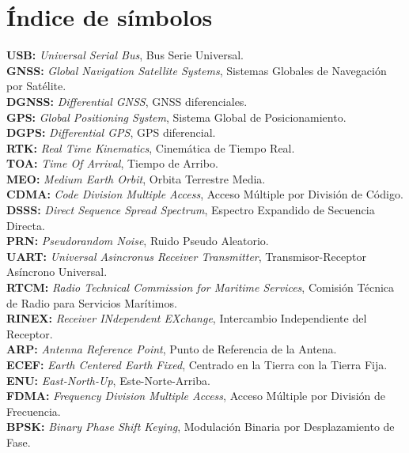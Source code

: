 \documentclass[a4paper,12pt,oneside,onecolumn,final,openright]{book}%
\begin{document}
\chapter*{Índice de símbolos}
\noindent\textbf{USB:} \textit{Universal Serial Bus}, Bus Serie Universal.\\
\textbf{GNSS:} \textit{Global Navigation Satellite Systems}, Sistemas Globales de Navegación por Satélite.\\
\textbf{DGNSS:} \textit{Differential GNSS}, GNSS diferenciales.\\
\textbf{GPS:} \textit{Global Positioning System}, Sistema Global de Posicionamiento.\\
\textbf{DGPS:} \textit{Differential GPS}, GPS diferencial.\\
\textbf{RTK:} \textit{Real Time Kinematics}, Cinemática de Tiempo Real.\\
\textbf{TOA:} \textit{Time Of Arrival}, Tiempo de Arribo.\\
\textbf{MEO:} \textit{Medium Earth Orbit}, Orbita Terrestre Media.\\
\textbf{CDMA:} \textit{Code Division Multiple Access}, Acceso Múltiple por División de Código.\\
\textbf{DSSS:} \textit{Direct Sequence Spread Spectrum}, Espectro Expandido de Secuencia Directa.\\
\textbf{PRN:} \textit{Pseudorandom Noise}, Ruido Pseudo Aleatorio.\\
\textbf{UART:} \textit{Universal Asincronus Receiver Transmitter}, Transmisor-Receptor Asíncrono Universal.\\
\textbf{RTCM:} \textit{Radio Technical Commission for Maritime Services}, Comisión Técnica de Radio para Servicios Marítimos.\\
\textbf{RINEX:} \textit{Receiver INdependent EXchange}, Intercambio Independiente del Receptor.\\
\textbf{ARP:} \textit{Antenna Reference Point}, Punto de Referencia de la Antena.\\
\textbf{ECEF:} \textit{Earth Centered Earth Fixed}, Centrado en la Tierra con la Tierra Fija.\\
\textbf{ENU:} \textit{East-North-Up}, Este-Norte-Arriba.\\
\textbf{FDMA:} \textit{Frequency Division Multiple Access}, Acceso Múltiple por División de Frecuencia.\\
\textbf{BPSK:} \textit{Binary Phase Shift Keying}, Modulación Binaria por Desplazamiento de Fase.\\
\end{document}
